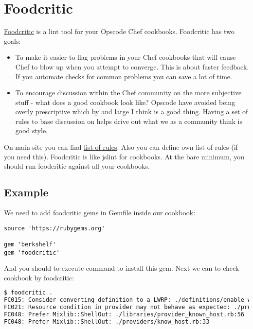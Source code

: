 \section{Foodcritic}
\label{sec:foodcritic}

\href{http://www.foodcritic.io/}{Foodcritic} is a lint tool for your Opscode Chef cookbooks. Foodcritic has two goals:

\begin{itemize}
  \item To make it easier to flag problems in your Chef cookbooks that will cause Chef to blow up when you attempt to converge. This is about faster feedback. If you automate checks for common problems you can save a lot of time.
  \item To encourage discussion within the Chef community on the more subjective stuff - what does a good cookbook look like? Opscode have avoided being overly prescriptive which by and large I think is a good thing. Having a set of rules to base discussion on helps drive out what we as a community think is good style.
\end{itemize}

On main site you can find \href{http://www.foodcritic.io/}{list of rules}. Also you can define own list of rules (if you need this). Foodcritic is like jslint for cookbooks. At the bare minimum, you should run foodcritic against all your cookbooks.

\subsection{Example}

We need to add foodcritic gems in Gemfile inside our  cookbook:

\begin{lstlisting}[label=lst:testing-foodcritic1]
source 'https://rubygems.org'

gem 'berkshelf'
gem 'foodcritic'
\end{lstlisting}

And you should to execute  command to install this gem. Next we can to check  cookbook by foodcritic:

\begin{lstlisting}[language=Bash,label=lst:testing-foodcritic2]
$ foodcritic .
FC015: Consider converting definition to a LWRP: ./definitions/enable_web_site.rb:1
FC021: Resource condition in provider may not behave as expected: ./providers/know_host.rb:39
FC048: Prefer Mixlib::ShellOut: ./libraries/provider_known_host.rb:56
FC048: Prefer Mixlib::ShellOut: ./providers/know_host.rb:33
\end{lstlisting}

